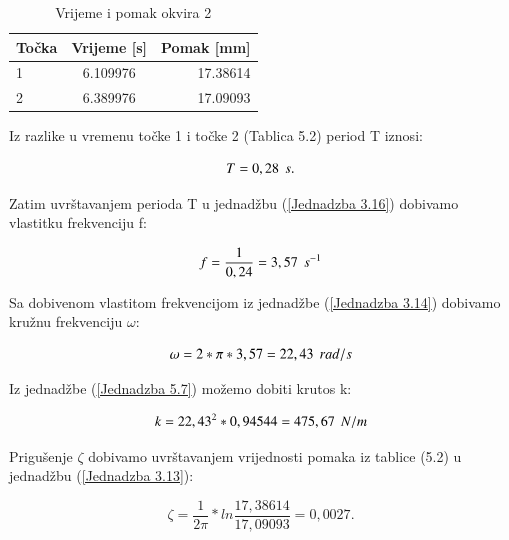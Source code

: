 \documentclass[12pt]{book}
\begin{document}
\begin{table}[H]
	\label{table4}
	\begin{center}
		\begin{tabular}{|l|c|r|}
			\hline
			Točka & Vrijeme [s] & Pomak [mm]\\
			\hline
			1 & 6.109976 & 17.38614 \\
			\hline
			2 & 6.389976 & 17.09093 \\
			\hline
		\end{tabular}
	\end{center}
	\caption{Vrijeme i pomak okvira 2}
\end{table}

Iz razlike u vremenu točke 1 i točke 2 (Tablica 5.2) period T iznosi:

\begin{equation}\label{Jednadzba 5.14}
	T = 0,28 \hspace{0.15cm} s.
\end{equation}

Zatim uvrštavanjem perioda T u jednadžbu (\ref{Jednadzba 3.16}) dobivamo vlastitku frekvenciju f:

\begin{equation}\label{Jednadzba 5.15}
	f = \frac{1}{0,24} = 3,57 \hspace{0.15cm} s^{-1}
\end{equation}

Sa dobivenom vlastitom frekvencijom iz jednadžbe (\ref{Jednadzba 3.14}) dobivamo kružnu frekvenciju $\omega$:

\begin{equation}\label{Jednadzba 5.16}
	\omega = 2 * \pi * 3,57 = 22,43 \hspace{0.15cm} rad/s
\end{equation}

Iz jednadžbe (\ref{Jednadzba 5.7}) možemo dobiti krutos k:

\begin{equation}\label{Jednadzba 5.17}
	k = 22,43^2 * 0,94544 = 475,67 \hspace{0.15cm} N/m
\end{equation}

Prigušenje $\zeta$ dobivamo uvrštavanjem vrijednosti pomaka iz tablice (5.2) u jednadžbu (\ref{Jednadzba 3.13}):

\begin{equation}\label{Jednadzba 5.18}
	\zeta = \frac{1}{2\pi} * ln\frac{17,38614}{17,09093} = 0,0027.
\end{equation}
\end{document}
